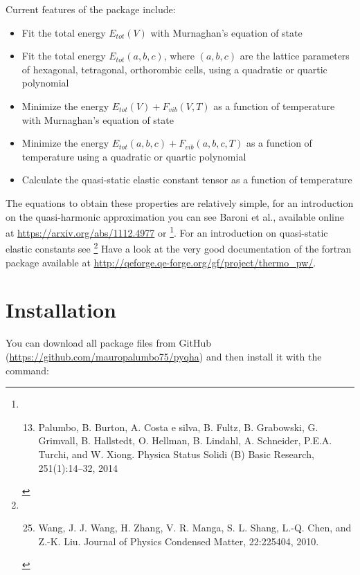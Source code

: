 \documentclass[letterpaper,10pt,english]{sphinxmanual}
\begin{document}
Current features of the package include:
\begin{itemize}
\item {} 
Fit the total energy \(E_{tot}(V)\) with Murnaghan's equation of state

\item {} 
Fit the total energy \(E_{tot}(a,b,c)\), where \((a,b,c)\) are the lattice parameters of hexagonal, tetragonal, orthorombic cells, using a quadratic or quartic polynomial

\item {} 
Minimize the energy \(E_{tot}(V)+F_{vib}(V,T)\) as a function of temperature with Murnaghan's equation of state

\item {} 
Minimize the energy \(E_{tot}(a,b,c)+F_{vib}(a,b,c,T)\) as a function of temperature using a quadratic or quartic polynomial

\item {} 
Calculate the quasi-static elastic constant tensor as a function of temperature

\end{itemize}

The equations to obtain these properties are relatively simple, for an introduction on the quasi-harmonic approximation you can see Baroni et al., available online at \url{https://arxiv.org/abs/1112.4977} or \footnote[3]{\sphinxAtStartFootnote
\begin{enumerate}
\setcounter{enumi}{12}
\item {} 
Palumbo, B. Burton, A. Costa e silva, B. Fultz, B. Grabowski, G. Grimvall, B. Hallstedt, O. Hellman, B. Lindahl, A. Schneider, P.E.A. Turchi, and W. Xiong. Physica Status Solidi (B) Basic Research, 251(1):14–32, 2014

\end{enumerate}
}. For an introduction on quasi-static elastic constants see \footnote[4]{\sphinxAtStartFootnote
\begin{enumerate}
\setcounter{enumi}{24}
\item {} 
Wang, J. J. Wang, H. Zhang, V. R. Manga, S. L. Shang, L.-Q. Chen, and Z.-K. Liu. Journal of Physics Condensed Matter, 22:225404, 2010.

\end{enumerate}
} Have a look at the very good documentation of the  fortran package available at \url{http://qeforge.qe-forge.org/gf/project/thermo\_pw/}.


\section{Installation}
\label{introduction:installation}
You can download all package files from GitHub (\url{https://github.com/mauropalumbo75/pyqha}) and then install it with the command:
\end{document}
